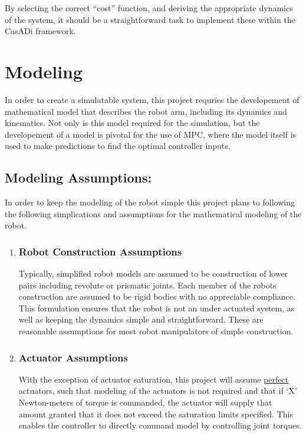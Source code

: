 \documentclass[12px]{article}
\begin{document}
    \noindent By selecting the correct ``cost'' function, and deriving the appropriate dynamics of the system, it should be a straightforward task to implement these within the CasADi framework.

    \section*{Modeling}

    In order to create a simulatable system, this project requries the developement of mathematical model that describes the robot arm, including its dynamics and kinematics. Not only is this model required for the simulation, but the developement of a model is pivotal for the use of MPC, where the model itself is used to make predictions to find the optimal controller inputs. \\

    \subsection*{Modeling Assumptions:}

    In order to keep the modeling of the robot simple this project plans to following the following simplications and assumptions for the mathematical modeling of the robot.


\begin{enumerate}
  \item \subsubsection*{Robot Construction Assumptions}

    Typically, simplified robot models are assumed to be construction of lower pairs including revolute or prismatic joints. Each member of the robots construction are assumed to be rigid bodies with no appreciable compliance. This formulation ensures that the robot is not an under actuated system, as well as keeping the dynamics simple and straightforward. These are reasonable assumptions for most robot manipulators of simple construction.

  \item \subsubsection*{Actuator Assumptions}

  With the exception of actuator saturation, this project will assume \underline{perfect} actuators, such that modeling of the actuators is not required and that if `X' Newton-meters of torque is commanded, the actuator will supply that amount granted that it does not exceed the saturation limits specified. This enables the controller to directly command model by controlling joint torques.

\end{enumerate}
\end{document}
